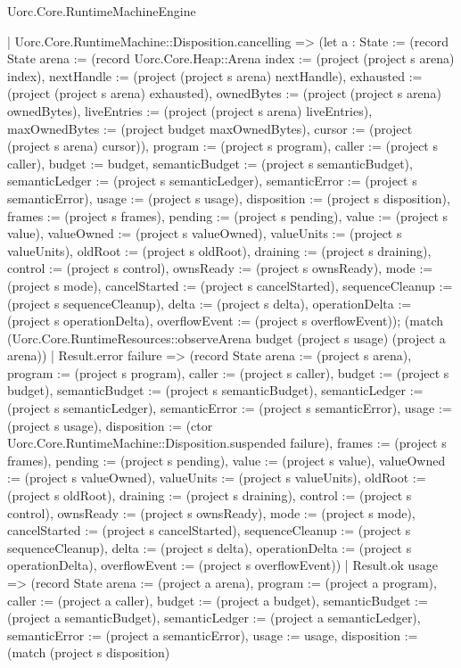 \begin{lexlean}{Uorc.Core.RuntimeMachineEngine}
\begin{semanticmodule}
{    | Uorc.Core.RuntimeMachine::Disposition.cancelling => (let a : State := (record State {arena := (record Uorc.Core.Heap::Arena {index := (project (project s arena) index), nextHandle := (project (project s arena) nextHandle), exhausted := (project (project s arena) exhausted), ownedBytes := (project (project s arena) ownedBytes), liveEntries := (project (project s arena) liveEntries), maxOwnedBytes := (project budget maxOwnedBytes), cursor := (project (project s arena) cursor)}), program := (project s program), caller := (project s caller), budget := budget, semanticBudget := (project s semanticBudget), semanticLedger := (project s semanticLedger), semanticError := (project s semanticError), usage := (project s usage), disposition := (project s disposition), frames := (project s frames), pending := (project s pending), value := (project s value), valueOwned := (project s valueOwned), valueUnits := (project s valueUnits), oldRoot := (project s oldRoot), draining := (project s draining), control := (project s control), ownsReady := (project s ownsReady), mode := (project s mode), cancelStarted := (project s cancelStarted), sequenceCleanup := (project s sequenceCleanup), delta := (project s delta), operationDelta := (project s operationDelta), overflowEvent := (project s overflowEvent)}); (match (Uorc.Core.RuntimeResources::observeArena budget (project s usage) (project a arena))
      | Result.error failure => (record State {arena := (project s arena), program := (project s program), caller := (project s caller), budget := (project s budget), semanticBudget := (project s semanticBudget), semanticLedger := (project s semanticLedger), semanticError := (project s semanticError), usage := (project s usage), disposition := (ctor Uorc.Core.RuntimeMachine::Disposition.suspended failure), frames := (project s frames), pending := (project s pending), value := (project s value), valueOwned := (project s valueOwned), valueUnits := (project s valueUnits), oldRoot := (project s oldRoot), draining := (project s draining), control := (project s control), ownsReady := (project s ownsReady), mode := (project s mode), cancelStarted := (project s cancelStarted), sequenceCleanup := (project s sequenceCleanup), delta := (project s delta), operationDelta := (project s operationDelta), overflowEvent := (project s overflowEvent)})
      | Result.ok usage => (record State {arena := (project a arena), program := (project a program), caller := (project a caller), budget := (project a budget), semanticBudget := (project a semanticBudget), semanticLedger := (project a semanticLedger), semanticError := (project a semanticError), usage := usage, disposition := (match (project s disposition)
}}
\end{semanticmodule}
\end{lexlean}
